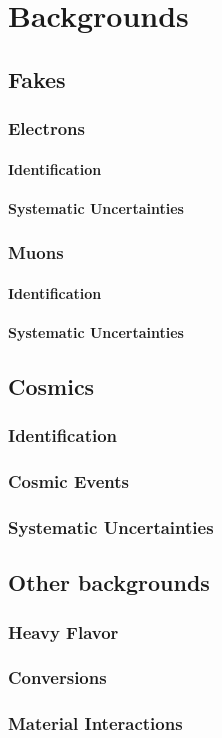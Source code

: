 \chapter{Backgrounds}

\section{Fakes}
\subsection{Electrons}
\subsubsection{Identification}
\subsubsection{Systematic Uncertainties}

\subsection{Muons}
\subsubsection{Identification}
\subsubsection{Systematic Uncertainties}

\section{Cosmics}
\subsection{Identification}
\subsection{Cosmic Events}
\subsection{Systematic Uncertainties}

\section{Other backgrounds}
\subsection{Heavy Flavor}
\subsection{Conversions}
\subsection{Material Interactions}


